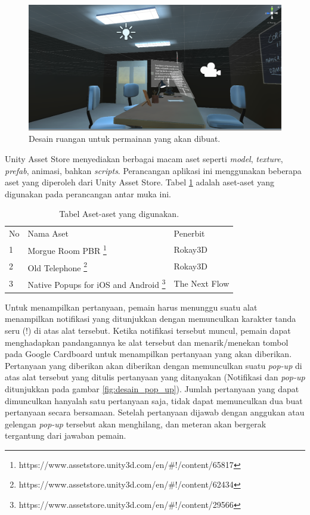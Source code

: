 \begin{figure}[htbp]
\centering
\includegraphics[scale=0.3]{Gambar/Desain-ruangan.PNG}
\caption{Desain ruangan untuk permainan yang akan dibuat.}
\label{fig:gambar_desain_ruangan}
\end{figure}

Unity Asset Store menyediakan berbagai macam aset seperti \textit{model}, \textit{texture}, \textit{prefab}, animasi, bahkan \textit{scripts}. Perancangan aplikasi ini menggunakan beberapa aset yang diperoleh dari Unity Asset Store. Tabel \ref{tab:tabel_aset_yang_digunakan} adalah aset-aset yang digunakan pada perancangan antar muka ini.

\begin{table}[]
    \centering
    \begin{tabular}{|p{1cm}||p{6cm}|p{6cm}|}
    \hline\\
    \hline
       No & Nama Aset & Penerbit \\
    \hline
        1 &  Morgue Room PBR \footnote{https://www.assetstore.unity3d.com/en/\#!/content/65817} & Rokay3D\\
    \hline
        2 &  Old Telephone \footnote{https://www.assetstore.unity3d.com/en/\#!/content/62434} & Rokay3D\\
    \hline
        3 &  Native Popups for iOS and Android \footnote{https://www.assetstore.unity3d.com/en/\#!/content/29566} & The Next Flow\\
    \hline
    \end{tabular}
    \caption{Tabel Aset-aset yang digunakan.}
    \label{tab:tabel_aset_yang_digunakan}
\end{table}

Untuk menampilkan pertanyaan, pemain harus menunggu suatu alat menampilkan notifikasi yang ditunjukkan dengan memunculkan karakter tanda seru (!) di atas alat tersebut. Ketika notifikasi tersebut muncul, pemain dapat menghadapkan pandangannya ke alat tersebut dan menarik/menekan tombol pada Google Cardboard untuk menampilkan pertanyaan yang akan diberikan. Pertanyaan yang diberikan akan diberikan dengan memunculkan suatu \textit{pop-up} di atas alat tersebut yang ditulis pertanyaan yang ditanyakan (Notifikasi dan \textit{pop-up} ditunjukkan pada gambar \ref{fig:desain_pop_up}). Jumlah pertanyaan yang dapat dimunculkan hanyalah satu pertanyaan saja, tidak dapat memunculkan dua buat pertanyaan secara bersamaan. Setelah pertanyaan dijawab dengan anggukan atau gelengan \textit{pop-up} tersebut akan menghilang, dan meteran akan bergerak tergantung dari jawaban pemain.

